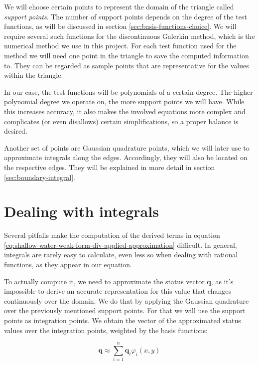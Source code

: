 \documentclass[a4paper, twoside]{article}
\renewcommand{\phi}{\varphi}
\begin{document}
We will choose certain points to represent the domain of the triangle called \emph{support points}.
The number of support points depends on the degree of the test functions, as will be discussed in section \ref{sec:basis-functions-choice}.
We will require several such functions for the discontinuous Galerkin method, which is the numerical method we use in this project.
For each test function used for the method we will need one point in the triangle to save the computed information to.
They can be regarded as sample points that are representative for the values within the triangle.

In our case, the test functions will be polynomials of a certain degree.
The higher polynomial degree we operate on, the more support points we will have.
While this increases accuracy, it also makes the involved equations more complex and complicates (or even disallows) certain simplifications, so a proper balance is desired.

Another set of points are Gaussian quadrature points, which we will later use to approximate integrals along the edges.
Accordingly, they will also be located on the respective edges.
They will be explained in more detail in section \ref{sec:boundary-integral}.

\section{Dealing with integrals}
\label{sec:matrix-extraction}

Several pitfalls make the computation of the derived terms in equation \ref{eq:shallow-water-weak-form-div-applied-approximation} difficult.
In general, integrals are rarely easy to calculate, even less so when dealing with rational functions, as they appear in our equation.

To actually compute it, we need to approximate the status vector $\mathbf{q}$, as it's impossible to derive an accurate representation for this value that changes continuously over the domain.
We do that by applying the Gaussian quadrature over the previously mentioned support points.
For that we will use the support points as integration points.
We obtain the vector of the approximated status values over the integration points, weighted by the basis functions:

\begin{equation}
  \label{eq:support-point-approximation}
  \mathbf{q} \approx \sum_{i=1}^n \mathbf{q}_i \phi_i\left(x,y\right)
\end{equation}
\end{document}

